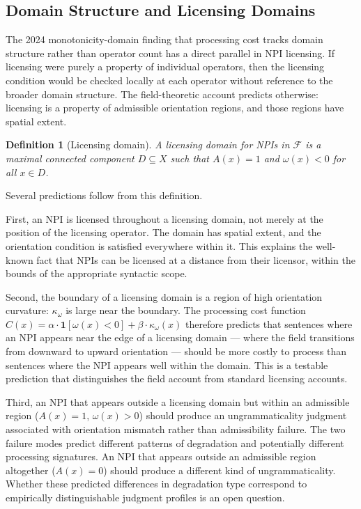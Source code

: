 \documentclass[12pt]{article}
\newtheorem{definition}[theorem]{Definition}
\theoremstyle{remark}
\begin{document}
\subsection{Domain Structure and Licensing Domains}

The 2024 monotonicity-domain finding that processing cost tracks domain
structure rather than operator count has a direct parallel in NPI
licensing. If licensing were purely a property of individual operators,
then the licensing condition would be checked locally at each operator
without reference to the broader domain structure. The field-theoretic
account predicts otherwise: licensing is a property of admissible
orientation regions, and those regions have spatial extent.

\begin{definition}[Licensing domain]
A \emph{licensing domain} for NPIs in $\mathcal{F}$ is a maximal
connected component $D \subseteq X$ such that $A(x) = 1$ and $\omega(x)
< 0$ for all $x \in D$.
\end{definition}

Several predictions follow from this definition.

First, an NPI is licensed throughout a licensing domain, not merely at
the position of the licensing operator. The domain has spatial extent,
and the orientation condition is satisfied everywhere within it. This
explains the well-known fact that NPIs can be licensed at a distance from
their licensor, within the bounds of the appropriate syntactic scope.

Second, the boundary of a licensing domain is a region of high
orientation curvature: $\kappa_\omega$ is large near the boundary. The
processing cost function $C(x) = \alpha \cdot \mathbf{1}[\omega(x) < 0]
+ \beta \cdot \kappa_\omega(x)$ therefore predicts that sentences where
an NPI appears near the edge of a licensing domain --- where the field
transitions from downward to upward orientation --- should be more
costly to process than sentences where the NPI appears well within the
domain. This is a testable prediction that distinguishes the field
account from standard licensing accounts.

Third, an NPI that appears outside a licensing domain but within an
admissible region ($A(x) = 1$, $\omega(x) > 0$) should produce an
ungrammaticality judgment associated with orientation mismatch rather
than admissibility failure. The two failure modes predict different
patterns of degradation and potentially different processing signatures.
An NPI that appears outside an admissible region altogether ($A(x) = 0$)
should produce a different kind of ungrammaticality. Whether these
predicted differences in degradation type correspond to empirically
distinguishable judgment profiles is an open question.
\end{document}
